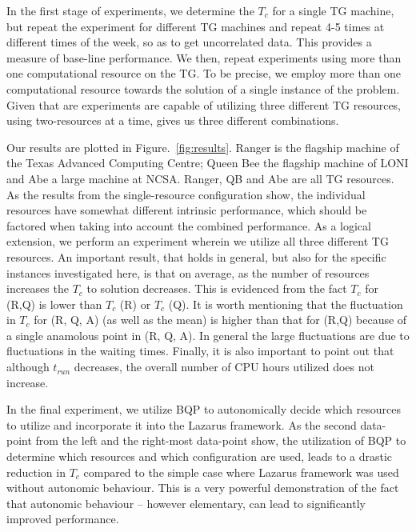 \documentclass{sig-alternate}
\newcommand{\tc}{$T_c$ }
\begin{document}
In the first stage of experiments, we determine the \tc for a single
TG machine, but repeat the experiment for different TG machines and
repeat 4-5 times at different times of the week, so as to get
uncorrelated data.  This provides a measure of base-line performance.
We then, repeat experiments using more than one computational resource
on the TG. To be precise, we employ more than one computational
resource towards the solution of a single instance of the problem.
Given that are experiments are capable of utilizing three different TG
resources, using two-resources at a time, gives us three different
combinations. 

Our results are plotted in Figure.~\ref{fig:results}.  Ranger is the flagship machine of the Texas Advanced Computing Centre; Queen Bee the flagship machine of LONI and Abe a large machine at NCSA. Ranger, QB and Abe are all TG resources. As the results from the single-resource configuration show, the individual resources have somewhat different intrinsic performance, which should be factored when taking into account the combined performance. As a logical extension, we perform an experiment wherein we utilize all three different TG resources. An important result, that holds in general, but also for the specific instances investigated here, is that on average, as the number of resources increases the \tc to solution decreases. This is evidenced from the fact \tc for (R,Q) is lower than \tc (R) or \tc (Q). It is worth mentioning that the fluctuation in \tc for (R, Q, A) (as well as the mean) is higher than that for (R,Q) because of a single anamolous point in (R, Q, A).  In general the large fluctuations are due to fluctuations in the waiting times. Finally, it is also important to point out that although $t_{run}$ decreases, the overall number of CPU hours utilized does not increase. %

In the final experiment, we utilize BQP to autonomically decide which
resources to utilize and incorporate it into the Lazarus framework.
As the second data-point from the left and the right-most data-point
show, the utilization of BQP to determine which resources and which
configuration are used, leads to a drastic reduction in \tc compared
to the simple case where Lazarus framework was used without autonomic
behaviour. This is a very powerful demonstration of the fact that
autonomic behaviour -- however elementary, can lead to significantly
improved performance.
\end{document}
